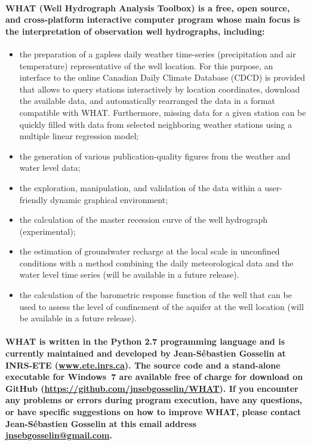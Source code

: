 \documentclass[10pt, letterpaper, fleqn]{report}
\begin{document}
\paragraph{WHAT (Well Hydrograph Analysis Toolbox) is a free, open source, and cross-platform interactive computer program whose main focus is the interpretation of observation well hydrographs, including:}
\begin{itemize}
\item{the preparation of a gapless daily weather time-series (precipitation and air temperature) representative of the well location. For this purpose, an interface to the online Canadian Daily Climate Database (CDCD) is provided that allows to query stations interactively by location coordinates, download the available data, and automatically rearranged the data in a format compatible with WHAT. Furthermore, missing data for a given station can be quickly filled with data from selected neighboring weather stations using a multiple linear regression model;}
\item{the generation of various publication-quality figures from the weather and water level data;}
\item{the exploration, manipulation, and validation of the data within a user-friendly dynamic graphical environment;}
\item{the calculation of the master recession curve of the well hydrograph (experimental);}
\item{the estimation of groundwater recharge at the local scale in unconfined conditions with a method combining the daily meteorological data and the water level time series (will be available in a future release).}
\item{the calculation of the barometric response function of the well that can be used to assess the level of confinement of the aquifer at the well location (will be available in a future release).}
\end{itemize}
\paragraph{WHAT is written in the Python 2.7 programming language and is currently maintained and developed by Jean-Sébastien Gosselin at INRS-ETE (\url{www.ete.inrs.ca}). The source code and a stand-alone executable for Windows 7 are available free of charge for download on GitHub (\url{https://github.com/jnsebgosselin/WHAT}). If you encounter any problems or errors during program execution, have any questions, or have specific suggestions on how to improve WHAT, please contact Jean-Sébastien Gosselin at this email address \href{mailto:jnsebgosselin@gmail.com}{jnsebgosselin@gmail.com}.}
\end{document}
